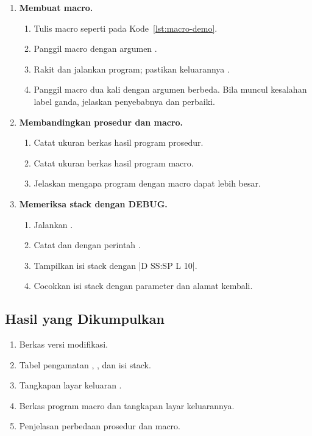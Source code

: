 \begin{enumerate}
    \item \textbf{Membuat macro.}
    \begin{enumerate}
        \item Tulis macro  seperti pada
              Kode~\ref{lst:macro-demo}.
        \item Panggil macro dengan argumen .
        \item Rakit dan jalankan program; pastikan keluarannya
              .
        \item Panggil macro dua kali dengan argumen berbeda. Bila
              muncul kesalahan label ganda, jelaskan penyebabnya dan
              perbaiki.
    \end{enumerate}

    \item \textbf{Membandingkan prosedur dan macro.}
    \begin{enumerate}
        \item Catat ukuran berkas hasil program prosedur.
        \item Catat ukuran berkas hasil program macro.
        \item Jelaskan mengapa program dengan macro dapat lebih besar.
    \end{enumerate}

    \item \textbf{Memeriksa stack dengan DEBUG.}
    \begin{enumerate}
        \item Jalankan .
        \item Catat  dan  dengan perintah .
        \item Tampilkan isi stack dengan
              \lstasm|D SS:SP L 10|.
        \item Cocokkan isi stack dengan parameter dan alamat kembali.
    \end{enumerate}
\end{enumerate}

\subsection{Hasil yang Dikumpulkan}

\begin{enumerate}
    \item Berkas  versi modifikasi.
    \item Tabel pengamatan , , dan isi stack.
    \item Tangkapan layar keluaran .
    \item Berkas program macro dan tangkapan layar keluarannya.
    \item Penjelasan perbedaan prosedur dan macro.
\end{enumerate}

